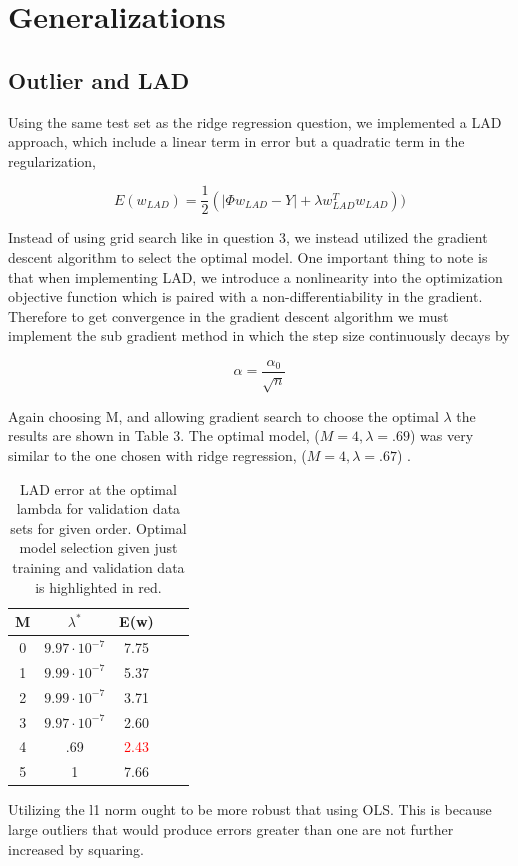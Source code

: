 \documentclass[10pt,twocolumn]{article}
\begin{document}
\section{Generalizations}
\subsection*{Outlier and LAD}

Using the same test set as the ridge regression question, we implemented a LAD approach, which include a linear term in error but a quadratic term in the regularization, 

\begin{equation}
E(w_{LAD}) = \frac{1}{2}(|\Phi w_{LAD}  -Y| + \lambda w_{LAD}^T w_{LAD}))
\end{equation}


Instead of using grid search like in question 3, we instead utilized the gradient descent algorithm to select the optimal model. One important thing to note is that when implementing LAD, we introduce a nonlinearity into the optimization objective function which is paired with a non-differentiability in the gradient. Therefore to get convergence in the gradient descent algorithm we must implement the sub gradient method in which the step size continuously decays by 

\begin{equation}
\alpha= \frac{\alpha_0 }{\sqrt{n}}
\end{equation}

Again choosing M, and allowing gradient search to choose the optimal $\lambda$  the results are shown in  Table 3. The optimal model, ($M=4, \lambda = .69$) was very similar to the one chosen with ridge regression, ($M=4, \lambda=.67$) .
\begin{table}
\begin{center}
  \begin{tabular}{ | c | c | c | c | c | }
    \hline
     M & $\lambda ^*$  & E(w) \\ \hline
     0 & $9.97 \cdot 10^{-7}$ & 7.75  \\ \hline
     1 & $9.99 \cdot 10^{-7}$ & 5.37   \\ \hline
     2 & $9.99 \cdot 10^{-7}$ & 3.71   \\ \hline
     3 & $9.97 \cdot 10^{-7}$ & 2.60   \\ \hline
     4 & .69 & \textcolor{red}{2.43}   \\ \hline
     5 & 1 & 7.66  \\ \hline    
    \hline
  \end{tabular}
  \caption{LAD error at the optimal lambda for validation data sets for given order. Optimal model selection given just training and validation data is highlighted in red. }
\end{center}
\label{table:ave_sse}
\end{table}




Utilizing the l1 norm ought to be more robust that using OLS. This is because large outliers that would produce errors greater than one are not further increased by squaring. 
 
 
\end{document}
